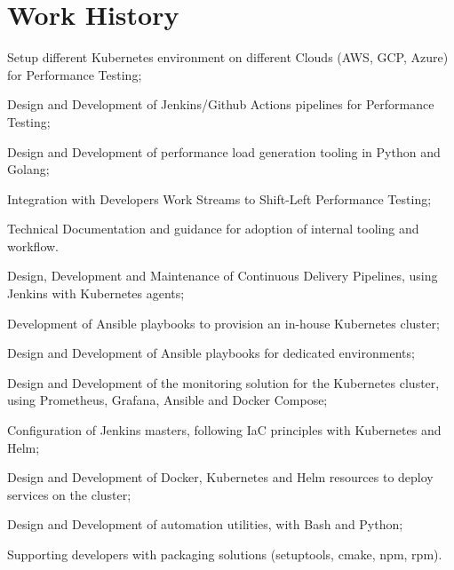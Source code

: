 \documentclass[]{deedy-resume-openfont}
\begin{document}
\begin{minipage}[t]{0.65\textwidth}

\section{Work History}


\vspace{\topsep} %
\begin{tightemize}
	\item Setup different Kubernetes environment on different Clouds (AWS, GCP, Azure) for Performance Testing;
	\item Design and Development of Jenkins/Github Actions pipelines for Performance Testing;
	\item Design and Development of performance load generation tooling in Python and Golang;
	\item Integration with Developers Work Streams to Shift-Left Performance Testing;
	\item Technical Documentation and guidance for adoption of internal tooling and workflow.
\end{tightemize}
\sectionsep

\vspace{\topsep} %
\begin{tightemize}
	\item Design, Development and Maintenance of Continuous Delivery Pipelines, using Jenkins with Kubernetes agents;
	\item Development of Ansible playbooks to provision an in-house Kubernetes cluster;
	\item Design and Development of Ansible playbooks for dedicated environments;
	\item Design and Development of the monitoring solution for the Kubernetes cluster, using Prometheus, Grafana, Ansible and Docker Compose;
	\item Configuration of Jenkins masters, following IaC principles with Kubernetes and Helm;
	\item Design and Development of Docker, Kubernetes and Helm resources to deploy services on the cluster;
	\item Design and Development of automation utilities, with Bash and Python;
	\item Supporting developers with packaging solutions (setuptools, cmake, npm, rpm).
\end{tightemize}
\sectionsep


\end{minipage}
\end{document}
